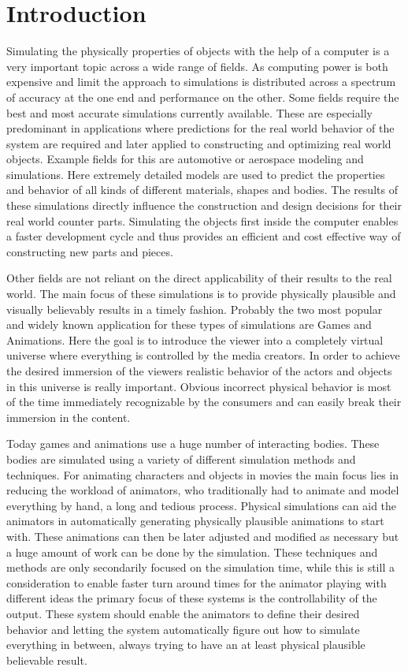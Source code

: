 \chapter{Introduction}
\label{cha:introduction}

Simulating the physically properties of objects with the help of a computer is a very important topic across a wide range of fields. As computing power is both expensive and limit the approach to simulations is distributed across a spectrum of accuracy at the one end and performance on the other. Some fields require the best and most accurate simulations currently available. These are especially predominant in applications where predictions for the real world behavior of the system are required and later applied to constructing and optimizing real world objects. Example fields for this are automotive or aerospace modeling and simulations. Here extremely detailed models are used to predict the properties and behavior of all kinds of different materials, shapes and bodies. The results of these simulations directly influence the construction and design decisions for their real world counter parts. Simulating the objects first inside the computer enables a faster development cycle and thus provides an efficient and cost effective way of constructing new parts and pieces.

Other fields are not reliant on the direct applicability of their results to the real world. The main focus of these simulations is to provide physically plausible and visually believably results in a timely fashion. Probably the two most popular and widely known application for these types of simulations are Games and Animations. Here the goal is to introduce the viewer into a completely virtual universe where everything is controlled by the media creators. In order to achieve the desired immersion of the viewers realistic behavior of the actors and objects in this universe is really important. Obvious incorrect physical behavior is most of the time immediately recognizable by the consumers and can easily break their immersion in the content.

Today games and animations use a huge number of interacting bodies. These bodies are simulated using a variety of different simulation methods and techniques. For animating characters and objects in movies the main focus lies in reducing the workload of animators, who traditionally had to animate and model everything by hand, a long and tedious process. Physical simulations can aid the animators in automatically generating physically plausible animations to start with. These animations can then be later adjusted and modified as necessary but a huge amount of work can be done by the simulation. These techniques and methods are only secondarily focused on the simulation time, while this is still a consideration to enable faster turn around times for the animator playing with different ideas the primary focus of these systems is the controllability of the output. These system should enable the animators to define their desired behavior and letting the system automatically figure out how to simulate everything in between, always trying to have an at least physical plausible believable result.

